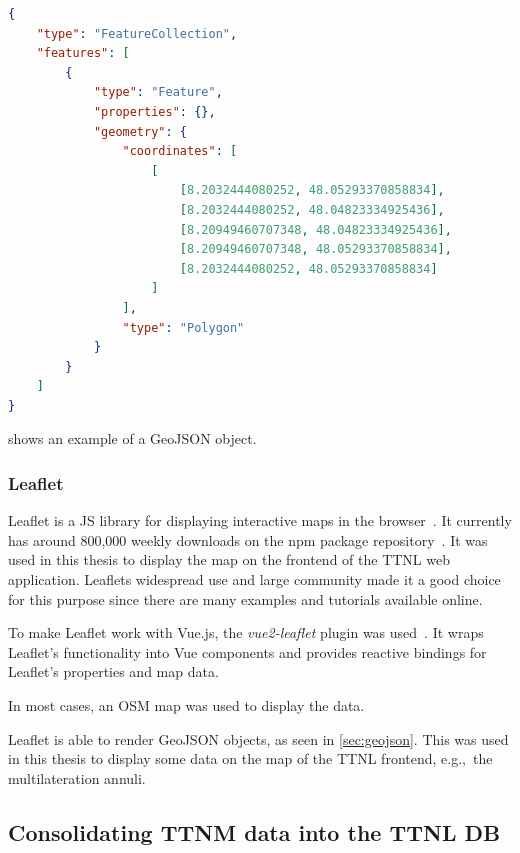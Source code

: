 \begin{lstlisting}[language=JSON, float, caption={Example of a GeoJSON that represents a rectangle above the furtwangen city center}, label={lst:geojson-example}]
{
    "type": "FeatureCollection",
    "features": [
        {
            "type": "Feature",
            "properties": {},
            "geometry": {
                "coordinates": [
                    [
                        [8.2032444080252, 48.05293370858834],
                        [8.2032444080252, 48.04823334925436],
                        [8.20949460707348, 48.04823334925436],
                        [8.20949460707348, 48.05293370858834],
                        [8.2032444080252, 48.05293370858834]
                    ]
                ],
                "type": "Polygon"
            }
        }
    ]
}  
\end{lstlisting}

 shows an example of a GeoJSON object.

\subsubsection{Leaflet}\label{sec:leaflet}

Leaflet is a \ac{JS} library for displaying interactive maps in the browser~\cite{volodymyr_agafonkin_leaflet_2023}.
It currently has around 800,000 weekly downloads on the npm package repository~\cite{npm_leaflet_2023}.
It was used in this thesis to display the map on the frontend of the \ac{TTNL} web application.
Leaflets widespread use and large community made it a good choice for this purpose since there are many examples and tutorials available online.

To make Leaflet work with Vue.js, the \emph{vue2-leaflet} plugin was used~\cite{vue_leaflet_team_vue_nodate}.
It wraps Leaflet's functionality into Vue components and provides reactive bindings for Leaflet's properties and map data.

In most cases, an \ac{OSM} map was used to display the data.

Leaflet is able to render GeoJSON objects, as seen in \cref{sec:geojson}.
This was used in this thesis to display some data on the map of the \ac{TTNL} frontend, e.g.,\ the multilateration annuli.

\subsection{Consolidating \acl{TTNM} data into the \acl{TTNL} \acl{DB}}\label{sec:consolidating-ttnm-data-into-ttnl-db}

